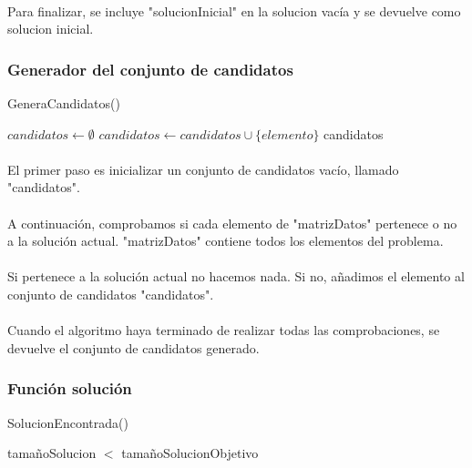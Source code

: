 \documentclass{article}
\begin{document}
		\paragraph{}Para finalizar, se incluye "solucionInicial" en la solucion vacía y se devuelve como solucion inicial.

	\subsubsection{Generador del conjunto de candidatos}
	\begin{algorithm}[H]
		\caption{GeneraCandidatos()}
		\begin{algorithmic}
			\STATE $candidatos \leftarrow \emptyset$
			\STATE $candidatos \leftarrow candidatos \cup \{elemento\}$
			\ENDIF
			\ENDFOR
			\RETURN candidatos
		\end{algorithmic}
	\end{algorithm}

	\paragraph{}El primer paso es inicializar un conjunto de candidatos vacío, llamado "candidatos".
	
	\paragraph{}A continuación, comprobamos si cada elemento de "matrizDatos" pertenece o no a la solución actual. "matrizDatos" contiene todos los elementos del problema.
	
	\paragraph{}Si pertenece a la solución actual no hacemos nada. Si no, añadimos el elemento al conjunto de candidatos "candidatos".
	
	\paragraph{}Cuando el algoritmo haya terminado de realizar todas las comprobaciones, se devuelve el conjunto de candidatos generado.

	\subsubsection{Función solución}
	\begin{algorithm}[H]
		\caption{SolucionEncontrada()}
		\begin{algorithmic}	
			\RETURN tamañoSolucion $<$ tamañoSolucionObjetivo 
		\end{algorithmic}
	\end{algorithm}
\end{document}
